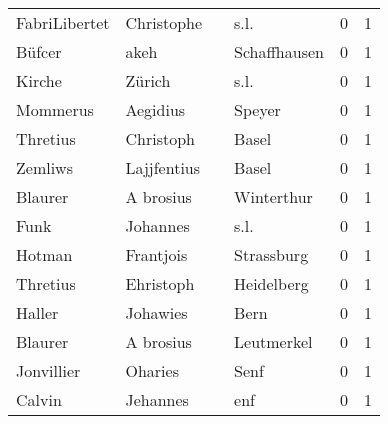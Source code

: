\begin{tabular}{llllrr}
            FabriLibertet &                         Christophe &             &                                        s.l. &          0 &         1 \\
                   Büfcer &                               akeh &             &                                Schaffhausen &          0 &         1 \\
                   Kirche &                             Zürich &             &                                        s.l. &          0 &         1 \\
                 Mommerus &                           Aegidius &             &                                      Speyer &          0 &         1 \\
                 Thretius &                          Christoph &             &                                       Basel &          0 &         1 \\
                  Zemliws &                        Lajjfentius &             &                                       Basel &          0 &         1 \\
                  Blaurer &                          A brosius &             &                                  Winterthur &          0 &         1 \\
                     Funk &                           Johannes &             &                                        s.l. &          0 &         1 \\
                   Hotman &                          Frantjois &             &                                  Strassburg &          0 &         1 \\
                 Thretius &                          Ehristoph &             &                                  Heidelberg &          0 &         1 \\
                   Haller &                           Johawies &             &                                        Bern &          0 &         1 \\
                  Blaurer &                          A brosius &             &                                  Leutmerkel &          0 &         1 \\
               Jonvillier &                            Oharies &             &                                        Senf &          0 &         1 \\
                   Calvin &                           Jehannes &             &                                         enf &          0 &         1 \\

\end{tabular}
